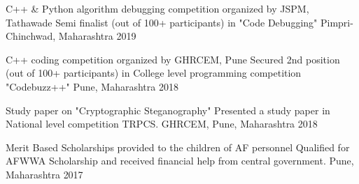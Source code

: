 

\begin{cventries}

  \cventry
    {C++ & Python algorithm debugging competition organized by JSPM, Tathawade} %
    {Semi finalist (out of 100+ participants) in "Code Debugging"} %
    {Pimpri-Chinchwad, Maharashtra} %
    {2019} %

  \cventry
    {C++ coding competition organized by GHRCEM, Pune} %
    {Secured 2nd position (out of 100+ participants) in College level programming competition "Codebuzz++"} %
    {Pune, Maharashtra} %
    {2018} %

  \cventry
    {Study paper on "Cryptographic Steganography"} %
    {Presented a study paper in National level competition TRPCS.} %
    {GHRCEM, Pune, Maharashtra} %
    {2018} %
    
  \cventry
    {Merit Based Scholarships provided to the children of AF personnel} %
    {Qualified for AFWWA Scholarship and received financial help from central government.} %
    {Pune, Maharashtra} %
    {2017} %
    
\end{cventries}
